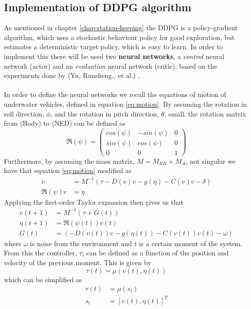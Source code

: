 \subsection{Implementation of DDPG algorithm}
As mentioned in chapter \ref{chap:station-keeping} the DDPG is a policy-gradient algorithm, which uses a stochastic behaviour policy for good exploration, but estimates a deterministic target policy, which is easy to learn. In order to implement this there will be used two \textbf{neural networks}, a \textit{control} neural network (actor) and an \textit{evaluation} neural network (critic), based on the experiments done by (Yu, Runsheng., et al.) \cite{Yu}.\\\\
In order to define the neural networks we recall the equations of motion of underwater vehicles, defined in equation \ref{eq:motion}. By assuming the rotation in roll direction, $\phi$, and the rotation in pitch direction, $\theta$, small, the rotation matrix from (Body) to (NED) can be defined as
\begin{equation}
    \Re(\psi) = 
    \begin{pmatrix}
    cos(\psi) & -sin(\psi) & 0 \\
    sin(\psi) & cos(\psi) & 0 \\
    0 & 0 & 1
    \end{pmatrix}
\end{equation}
Furthermore, by assuming the mass matrix, $M=M_{RB}+M_{A}$, not singular we have that equation \ref{eq:motion} modified as
\begin{align}
    \Dot{v} & = M^{-1}(\tau-D(v)v-g(\eta)-C(v)v-\delta) \\
    \Re(\psi)v & = \Dot{\eta}
\end{align}
Applying the first-order Taylor expansion then gives us that
\begin{align}
    v(t+1) & = M^{-1}(\tau+G(t)) \\
    \eta(t+1) & = \Re(\psi(t))v(t) \\
    G(t) &= (-D(v(t))v-g(\eta(t))-C(v(t))v(t)-\omega)
\end{align}
where $\omega$ is noise from the environment and $t$ is a certain moment of the system. From this the controller, $\tau$, can be defined as a function of the position and velocity of the previous moment. This is given by
\begin{equation}
    \tau(t) = \mu(v(t), \eta(t))
\end{equation}
which can be simplified as
\begin{align}
    \tau(t) & = \mu(s_{t}) \\
    s_{t} & = [v(t),\eta(t)]^{T}
    \label{eq:tau}
\end{align}
